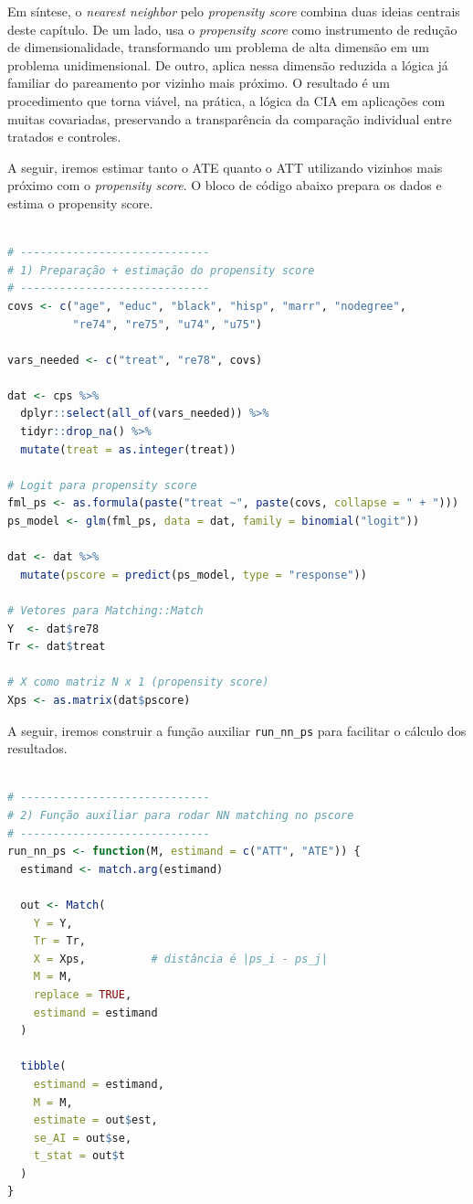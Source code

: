 Em síntese, o \textit{nearest neighbor} pelo \textit{propensity score} combina duas ideias centrais deste capítulo. De um lado, usa o \textit{propensity score} como instrumento de redução de dimensionalidade, transformando um problema de alta dimensão em um problema unidimensional. De outro, aplica nessa dimensão reduzida a lógica já familiar do pareamento por vizinho mais próximo. O resultado é um procedimento que torna viável, na prática, a lógica da CIA em aplicações com muitas covariadas, preservando a transparência da comparação individual entre tratados e controles.

A seguir, iremos estimar tanto o ATE quanto o ATT utilizando vizinhos mais próximo com o \textit{propensity score}. O bloco de código abaixo prepara os dados e estima o propensity score.

\begin{boxH}
\begin{lstlisting}[language = R]

# -----------------------------
# 1) Preparação + estimação do propensity score
# -----------------------------
covs <- c("age", "educ", "black", "hisp", "marr", "nodegree",
          "re74", "re75", "u74", "u75")

vars_needed <- c("treat", "re78", covs)

dat <- cps %>%
  dplyr::select(all_of(vars_needed)) %>%
  tidyr::drop_na() %>%
  mutate(treat = as.integer(treat))

# Logit para propensity score
fml_ps <- as.formula(paste("treat ~", paste(covs, collapse = " + ")))
ps_model <- glm(fml_ps, data = dat, family = binomial("logit"))

dat <- dat %>%
  mutate(pscore = predict(ps_model, type = "response"))

# Vetores para Matching::Match
Y  <- dat$re78
Tr <- dat$treat

# X como matriz N x 1 (propensity score)
Xps <- as.matrix(dat$pscore)

\end{lstlisting}
\end{boxH}

A seguir, iremos construir a função auxiliar \texttt{run\_nn\_ps} para facilitar o cálculo dos resultados.

\begin{boxH}
\begin{lstlisting}[language = R]

# -----------------------------
# 2) Função auxiliar para rodar NN matching no pscore
# -----------------------------
run_nn_ps <- function(M, estimand = c("ATT", "ATE")) {
  estimand <- match.arg(estimand)
  
  out <- Match(
    Y = Y,
    Tr = Tr,
    X = Xps,          # distância é |ps_i - ps_j|
    M = M,
    replace = TRUE,
    estimand = estimand
  )
  
  tibble(
    estimand = estimand,
    M = M,
    estimate = out$est,
    se_AI = out$se,
    t_stat = out$t
  )
}

\end{lstlisting}
\end{boxH}

